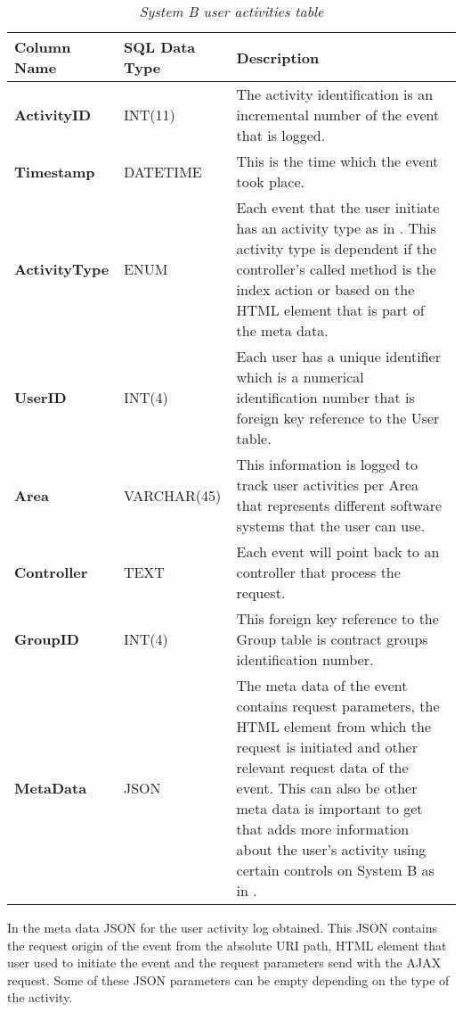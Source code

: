 \begin{table}[!htb]
	\centering
	\small
	\caption[System B user activities table]
	{\textit{System B user activities table}}
	\label{tbl:CH2_SystemB_LoggingTable}
	\begin{tabularx}{\textwidth}{|l|l|X|}
		\hline \textbf{Column Name} & \textbf{SQL Data Type} & \textbf{Description} \\
		\hline \textbf{ActivityID} & INT(11) & The activity identification is an incremental number of the event that is logged.\\
		\hline \textbf{Timestamp} & DATETIME & This is the time which the event took place.\\
		\hline \textbf{ActivityType} & ENUM & Each event that the user initiate has an activity type as in \Cref{tbl:Ch2_SystemB_ActivityTypes}. This activity type is dependent if the controller's called method is the index action or based on the HTML element that is part of the meta data. \\
		\hline \textbf{UserID} & INT(4) & Each user has a unique identifier which is a numerical identification number that is foreign key reference to the User table. \\
		\hline \textbf{Area} & VARCHAR(45) & This information is logged to track user activities per Area that represents different software systems that the user can use. \\
		\hline \textbf{Controller} & TEXT & Each event will point back to an controller that process the request. \\
		\hline \textbf{GroupID} & INT(4) & This foreign key reference to the Group table is contract groups identification number. \\
		\hline \textbf{MetaData} & JSON & The meta data of the event contains request parameters, the HTML element from which the request is initiated and other relevant request data of the event. This can also be other meta data is important to get that adds more information about the user's activity using certain controls on System B as in \Cref{fig:CH2_SystemBMetaData}. \\
		\hline
	\end{tabularx}
\end{table}

In  the meta data JSON for the user activity log obtained. This JSON contains the request origin of the event from the absolute URI path, HTML element that user used to initiate the event and the request parameters send with the AJAX request. Some of these JSON parameters can be empty depending on the type of the activity.


